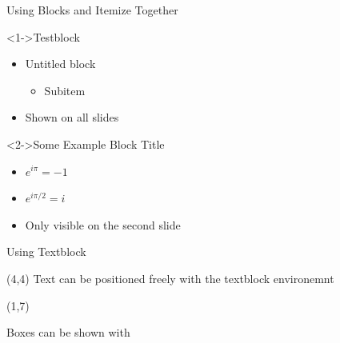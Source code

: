 \documentclass[english,american,german,aspectratio=43]{beamer}
\begin{document}
\begin{frame}{Using Blocks and Itemize Together}

  \begin{block}<1->{Testblock}

    \begin{itemize}
      \item Untitled block

        \begin{itemize}
          \item Subitem
        \end{itemize}
      \item Shown on all slides
    \end{itemize}
  \end{block}

  \begin{block}<2->{Some Example Block Title}

    \begin{itemize}
      \item $e^{i\pi}=-1$
      \item $e^{i\pi/2}=i$
      \item Only visible on the second slide
    \end{itemize}
  \end{block}
\end{frame}
\begin{frame}{Using Textblock}

  \begin{textblock}{5}(4,4)
    Text can be positioned freely with the textblock environemnt
  \end{textblock}
  \begin{textblock}{7}(1,7)
    \begin{tcolorbox}
      Boxes can be shown with 
    \end{tcolorbox}
  \end{textblock}
\end{frame}
\end{document}
